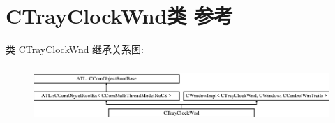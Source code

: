 \hypertarget{class_c_tray_clock_wnd}{}\section{C\+Tray\+Clock\+Wnd类 参考}
\label{class_c_tray_clock_wnd}
类 C\+Tray\+Clock\+Wnd 继承关系图\+:\begin{figure}[H]
\begin{center}
\leavevmode
\includegraphics[height=2.187500cm]{class_c_tray_clock_wnd}
\end{center}
\end{figure}
